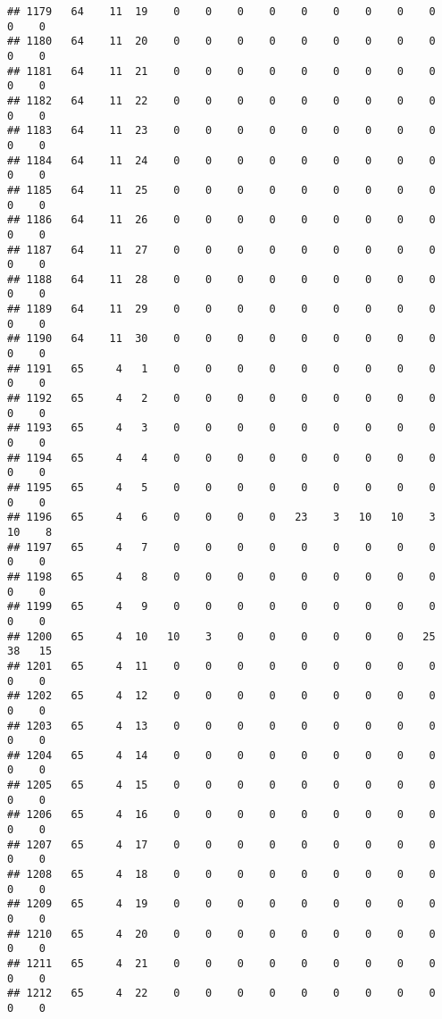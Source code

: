 \documentclass[]{article}
\begin{document}
\begin{verbatim}
## 1179   64    11  19    0    0    0    0    0    0    0    0    0    0    0
## 1180   64    11  20    0    0    0    0    0    0    0    0    0    0    0
## 1181   64    11  21    0    0    0    0    0    0    0    0    0    0    0
## 1182   64    11  22    0    0    0    0    0    0    0    0    0    0    0
## 1183   64    11  23    0    0    0    0    0    0    0    0    0    0    0
## 1184   64    11  24    0    0    0    0    0    0    0    0    0    0    0
## 1185   64    11  25    0    0    0    0    0    0    0    0    0    0    0
## 1186   64    11  26    0    0    0    0    0    0    0    0    0    0    0
## 1187   64    11  27    0    0    0    0    0    0    0    0    0    0    0
## 1188   64    11  28    0    0    0    0    0    0    0    0    0    0    0
## 1189   64    11  29    0    0    0    0    0    0    0    0    0    0    0
## 1190   64    11  30    0    0    0    0    0    0    0    0    0    0    0
## 1191   65     4   1    0    0    0    0    0    0    0    0    0    0    0
## 1192   65     4   2    0    0    0    0    0    0    0    0    0    0    0
## 1193   65     4   3    0    0    0    0    0    0    0    0    0    0    0
## 1194   65     4   4    0    0    0    0    0    0    0    0    0    0    0
## 1195   65     4   5    0    0    0    0    0    0    0    0    0    0    0
## 1196   65     4   6    0    0    0    0   23    3   10   10    3   10    8
## 1197   65     4   7    0    0    0    0    0    0    0    0    0    0    0
## 1198   65     4   8    0    0    0    0    0    0    0    0    0    0    0
## 1199   65     4   9    0    0    0    0    0    0    0    0    0    0    0
## 1200   65     4  10   10    3    0    0    0    0    0    0   25   38   15
## 1201   65     4  11    0    0    0    0    0    0    0    0    0    0    0
## 1202   65     4  12    0    0    0    0    0    0    0    0    0    0    0
## 1203   65     4  13    0    0    0    0    0    0    0    0    0    0    0
## 1204   65     4  14    0    0    0    0    0    0    0    0    0    0    0
## 1205   65     4  15    0    0    0    0    0    0    0    0    0    0    0
## 1206   65     4  16    0    0    0    0    0    0    0    0    0    0    0
## 1207   65     4  17    0    0    0    0    0    0    0    0    0    0    0
## 1208   65     4  18    0    0    0    0    0    0    0    0    0    0    0
## 1209   65     4  19    0    0    0    0    0    0    0    0    0    0    0
## 1210   65     4  20    0    0    0    0    0    0    0    0    0    0    0
## 1211   65     4  21    0    0    0    0    0    0    0    0    0    0    0
## 1212   65     4  22    0    0    0    0    0    0    0    0    0    0    0

\end{verbatim}
\end{document}
